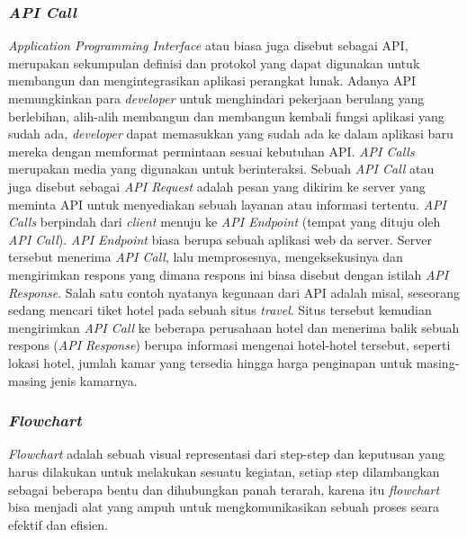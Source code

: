 \documentclass[a4paper]{article}
\newcommand{\subsubbab}[1]{%
    \subsubsection{#1}%
}
\begin{document}
\subsubbab{\textit{API Call}}
\textit{Application Programming Interface} atau biasa juga disebut sebagai API, merupakan sekumpulan definisi dan protokol yang dapat digunakan untuk membangun dan mengintegrasikan aplikasi perangkat lunak\autocite{whats-api}. Adanya API memungkinkan para \textit{developer} untuk menghindari pekerjaan berulang yang berlebihan, alih-alih membangun dan membangun kembali fungsi aplikasi yang sudah ada, \textit{developer} dapat memasukkan yang sudah ada ke dalam aplikasi baru mereka dengan memformat permintaan sesuai kebutuhan API\autocite{whats-api-2}. \textit{API Calls} merupakan media yang digunakan untuk berinteraksi. Sebuah \textit{API Call} atau juga disebut sebagai \textit{API Request} adalah pesan yang dikirim ke server yang meminta API untuk menyediakan sebuah layanan atau informasi tertentu. \textit{API Calls} berpindah dari \textit{client} menuju ke \textit{API Endpoint} (tempat yang dituju oleh \textit{API Call}). \textit{API Endpoint} biasa berupa sebuah aplikasi web da server. Server tersebut menerima \textit{API Call}, lalu memprosesnya, mengeksekusinya dan mengirimkan respons yang dimana respons ini biasa disebut dengan istilah \textit{API Response}\autocite{whats-api-call}. Salah satu contoh nyatanya kegunaan dari API adalah misal, seseorang sedang mencari tiket hotel pada sebuah situs \textit{travel}. Situs tersebut kemudian mengirimkan \textit{API Call} ke beberapa perusahaan hotel dan menerima balik sebuah respons (\textit{API Response}) berupa informasi mengenai hotel-hotel tersebut, seperti lokasi hotel, jumlah kamar yang tersedia hingga harga penginapan untuk masing-masing jenis kamarnya.

\subsubbab{\textit{Flowchart}}
\textit{Flowchart} adalah sebuah visual representasi dari step-step dan keputusan yang harus dilakukan untuk melakukan sesuatu kegiatan, setiap step dilambangkan sebagai beberapa bentu dan dihubungkan panah terarah, karena itu \textit{flowchart} bisa menjadi alat yang ampuh untuk mengkomunikasikan sebuah proses seara efektif dan efisien\autocite{smartdraw-flowchart}.
\end{document}
